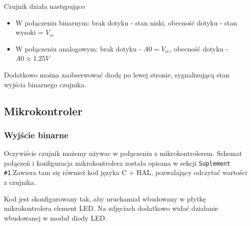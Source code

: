\documentclass[11pt, a4paper]{article}
\begin{document}
Czujnik działa następująco
\begin{itemize}
    \item W połączeniu binarnym: brak dotyku - stan niski, obecność dotyku - stan wysoki = $V_{cc}$
    \item W połączeniu analogowym: brak dotyku - $A0 = V_{cc}$, obecność dotyku - $A0 \approx 1.25 V$
\end{itemize}

Dodatkowo można zaobserwować diodę po lewej stronie, sygnalizującą stan wyjścia binarnego czujnika.

\newpage
\subsection{Mikrokontroler}
\subsubsection{Wyjście binarne}
Oczywiście czujnik możemy używac w połączeniu z mikrokontrolerem. Schemat połączeń i konfiguracja
mikrokontrolera została opisana w sekcji \texttt{Suplement \#1}.Zawiera tam się również kod języka
C + HAL, pozwalający odczytać wartości z czujnika.

Kod jest skonfigurowany tak, aby uruchamiał wbudowany w płytkę mikrokontrolera element LED. Na 
zdjęciach dodatkowo widać działanie wbudowanej w moduł diody LED. 
\end{document}
